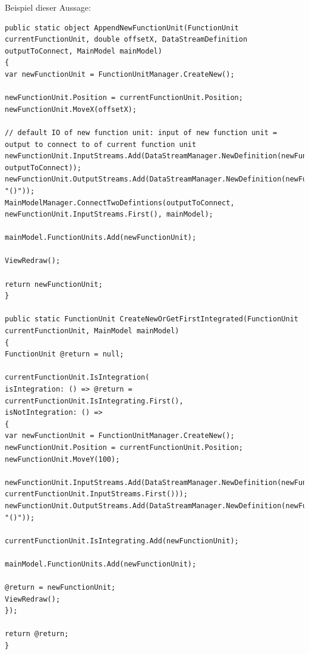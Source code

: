 Beispiel dieser Aussage:
\begin{verbatim}
public static object AppendNewFunctionUnit(FunctionUnit currentFunctionUnit, double offsetX, DataStreamDefinition outputToConnect, MainModel mainModel)
{
var newFunctionUnit = FunctionUnitManager.CreateNew();

newFunctionUnit.Position = currentFunctionUnit.Position;
newFunctionUnit.MoveX(offsetX);

// default IO of new function unit: input of new function unit = output to connect to of current function unit
newFunctionUnit.InputStreams.Add(DataStreamManager.NewDefinition(newFunctionUnit, outputToConnect));
newFunctionUnit.OutputStreams.Add(DataStreamManager.NewDefinition(newFunctionUnit, "()"));
MainModelManager.ConnectTwoDefintions(outputToConnect, newFunctionUnit.InputStreams.First(), mainModel);

mainModel.FunctionUnits.Add(newFunctionUnit);

ViewRedraw();

return newFunctionUnit;
}

public static FunctionUnit CreateNewOrGetFirstIntegrated(FunctionUnit currentFunctionUnit, MainModel mainModel)
{
FunctionUnit @return = null;

currentFunctionUnit.IsIntegration(
isIntegration: () => @return = currentFunctionUnit.IsIntegrating.First(),
isNotIntegration: () =>
{
var newFunctionUnit = FunctionUnitManager.CreateNew();
newFunctionUnit.Position = currentFunctionUnit.Position;
newFunctionUnit.MoveY(100);

newFunctionUnit.InputStreams.Add(DataStreamManager.NewDefinition(newFunctionUnit, currentFunctionUnit.InputStreams.First()));
newFunctionUnit.OutputStreams.Add(DataStreamManager.NewDefinition(newFunctionUnit, "()"));

currentFunctionUnit.IsIntegrating.Add(newFunctionUnit);

mainModel.FunctionUnits.Add(newFunctionUnit);

@return = newFunctionUnit;
ViewRedraw();
});

return @return;
}
\end{verbatim}



